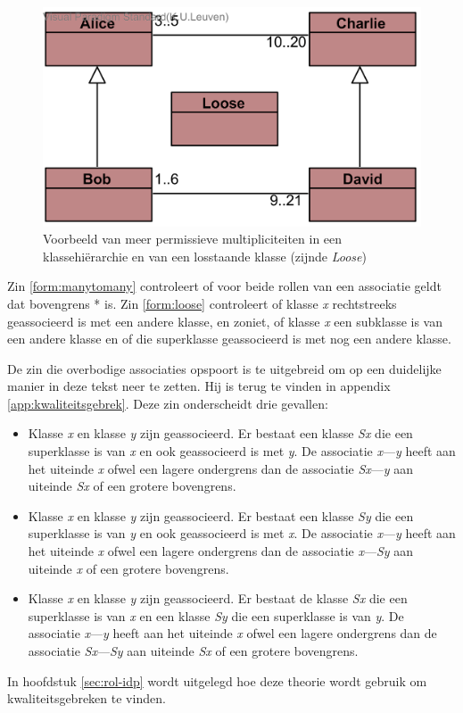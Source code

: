 \begin{figure}
	\includegraphics{chap-kwaliteitsgebrek/hierarchy.png}
	\caption{Voorbeeld van meer permissieve multipliciteiten in een klassehi\"erarchie en van een losstaande klasse (zijnde \textit{Loose})}
	\label{fig:hierarchie}
\end{figure}

Zin \ref{form:manytomany} controleert of voor beide rollen van een associatie geldt dat bovengrens * is. Zin \ref{form:loose} controleert of klasse \textit{x} rechtstreeks geassocieerd is met een andere klasse, en zoniet, of klasse \textit{x} een subklasse is van een andere klasse en of die superklasse geassocieerd is met nog een andere klasse.

De zin die overbodige associaties opspoort is te uitgebreid om op een duidelijke manier in deze tekst neer te zetten. Hij is terug te vinden in appendix \ref{app:kwaliteitsgebrek}.
Deze zin onderscheidt drie gevallen:

\begin{itemize}
	\item Klasse \textit{x} en klasse \textit{y} zijn geassocieerd. Er bestaat een klasse \textit{Sx} die een superklasse is van \textit{x} en ook geassocieerd is met \textit{y}. De associatie \textit{x}---\textit{y} heeft aan het uiteinde \textit{x} ofwel een lagere ondergrens dan de associatie \textit{Sx}---\textit{y} aan uiteinde \textit{Sx} of een grotere bovengrens.
	\item Klasse \textit{x} en klasse \textit{y} zijn geassocieerd. Er bestaat een klasse \textit{Sy} die een superklasse is van \textit{y} en ook geassocieerd is met \textit{x}. De associatie \textit{x}---\textit{y} heeft aan het uiteinde \textit{x} ofwel een lagere ondergrens dan de associatie \textit{x}---\textit{Sy} aan uiteinde \textit{x} of een grotere bovengrens.
	\item Klasse \textit{x} en klasse \textit{y} zijn geassocieerd. Er bestaat de klasse \textit{Sx} die een superklasse is van \textit{x} en een klasse \textit{Sy} die een superklasse is van \textit{y}. De associatie \textit{x}---\textit{y} heeft aan het uiteinde \textit{x} ofwel een lagere ondergrens dan de associatie \textit{Sx}---\textit{Sy} aan uiteinde \textit{Sx} of een grotere bovengrens.
\end{itemize}

In hoofdstuk \ref{sec:rol-idp} wordt uitgelegd hoe deze theorie wordt gebruik om kwaliteitsgebreken te vinden.